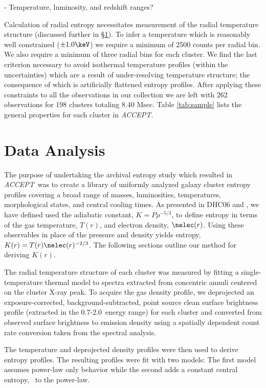 \documentclass[12pt, preprint]{aastex}
\newcommand{\accept}{\textit{ACCEPT}}
\begin{document}
- Temperature, luminosity, and redshift ranges?

Calculation of radial entropy necessitates measurement of the radial
temperature structure (discussed further in \S\ref{sec:data}). To
infer a temperature which is reasonably well constrained ($\pm 1.0
\keV$) we require a minimum of 2500 counts per radial bin. We also
require a minimum of three radial bins for each cluster. We find the
last criterion necessary to avoid isothermal temperature profiles
(within the uncertainties) which are a result of under-resolving
temperature structure; the consequence of which is artificially
flattened entropy profiles. After applying these constraints to all
the observations in our collection we are left with 262 observations
for 198 clusters totaling 8.40 Msec. Table \ref{tab:sample} lists the
general properties for each cluster in \accept.


\section{Data Analysis}
\label{sec:data}

The purpose of undertaking the archival entropy study which resulted in
\accept\ was to create a library of uniformly analyzed galaxy cluster
entropy profiles covering a broad range of masses, luminosities,
temperatures, morphological states, and central cooling times. As
presented in DHC06 and \cite{2002ApJ...576..601V}, we have defined
used the adiabatic constant, $K=P\rho^{-5/3}$, to define entropy in
terms of the gas temperature, $T(r)$, and electron density,
$\nelec(r)$. Using these observables in place of the pressure and
density yields entropy, $K(r) = T(r) \nelec(r)^{-2/3}$. The following
sections outline our method for deriving $K(r)$.

The radial temperature structure of each cluster was measured by
fitting a single-temperature thermal model to spectra extracted from
concentric annuli centered on the cluster X-ray peak. To acquire the
gas density profile, we deprojected an exposure-corrected,
background-subtracted, point source clean surface brightness profile
(extracted in the 0.7-2.0\keV\ energy range) for each cluster and
converted from observed surface brightness to emission density using a
spatially dependent count rate conversion taken from the spectral
analysis.

The temperature and deprojected density profiles were then used to
derive entropy profiles. The resulting profiles were fit with two
models: The first model assumes power-law only behavior while the
second adds a constant central entropy, \kna\, to the power-law.
\end{document}
